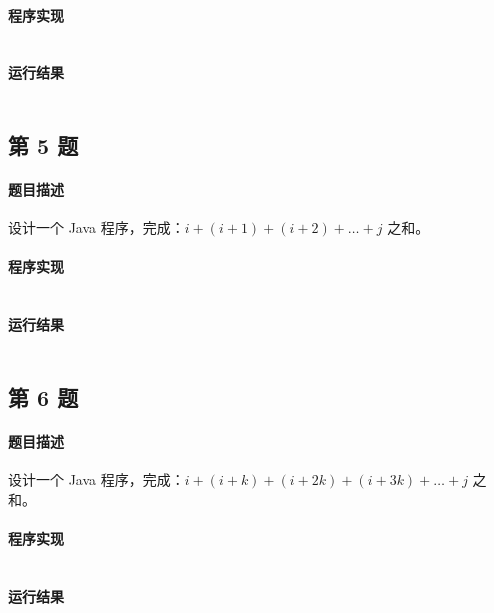 \documentclass{academics}
\begin{document}
\paragraph{程序实现} {
    \inputminted[label=Solution.java]{java}{../src/P04/Solution.java}
}

\paragraph{运行结果} {
    \inputminted{text}{../res/P04.out}
}

\subsection{第 5 题}

\paragraph{题目描述} {
    设计一个 Java 程序，完成：$i+\left(i+1\right)+\left(i+2\right)+\dots+j$ 之和。
}

\paragraph{程序实现} {
    \inputminted[label=Solution.java]{java}{../src/P05/Solution.java}
}

\paragraph{运行结果} {
    \inputminted{text}{../res/P05.out}
}

\subsection{第 6 题}

\paragraph{题目描述} {
    设计一个 Java 程序，完成：$i+\left(i+k\right)+\left(i+2k\right)+\left(i+3k\right)+\dots+j$ 之和。
}

\paragraph{程序实现} {
    \inputminted[label=Solution.java]{java}{../src/P06/Solution.java}
}

\paragraph{运行结果} {
    \inputminted{text}{../res/P06.out}
}
\end{document}
